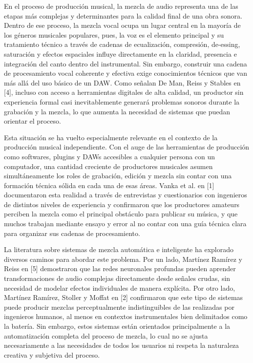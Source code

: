 
En el proceso de producción musical, la mezcla de audio representa una de las etapas más complejas y determinantes para la calidad final de una obra sonora. Dentro de ese proceso, la mezcla vocal ocupa un lugar central en la mayoría de los géneros musicales populares, pues, la voz es el elemento principal y su tratamiento técnico a través de cadenas de ecualización, compresión, de-essing, saturación y efectos espaciales influye directamente en la claridad, presencia e integración del canto dentro del instrumental. Sin embargo, construir una cadena de procesamiento vocal coherente y efectiva exige conocimientos técnicos que van más allá del uso básico de un DAW. Como señalan De Man, Reiss y Stables en [4], incluso con acceso a herramientas digitales de alta calidad, un productor sin experiencia formal casi inevitablemente generará problemas sonoros durante la grabación y la mezcla, lo que aumenta la necesidad de sistemas que puedan orientar el proceso.

Esta situación se ha vuelto especialmente relevante en el contexto de la producción musical independiente. Con el auge de las herramientas de producción como softwares, plugins y DAWs accesibles a cualquier persona con un computador, una cantidad creciente de productores musicales asumen simultáneamente los roles de grabación, edición y mezcla sin contar con una formación técnica sólida en cada una de esas áreas. Vanka et al. en [1] documentaron esta realidad a través de entrevistas y cuestionarios con ingenieros de distintos niveles de experiencia y confirmaron que los productores amateurs perciben la mezcla como el principal obstáculo para publicar su música, y que muchos trabajan mediante ensayo y error al no contar con una guía técnica clara para organizar sus cadenas de procesamiento.

La literatura sobre sistemas de mezcla automática e inteligente ha explorado diversos caminos para abordar este problema. Por un lado, Martínez Ramírez y Reiss en [5] demostraron que las redes neuronales profundas pueden aprender transformaciones de audio complejas directamente desde señales crudas, sin necesidad de modelar efectos individuales de manera explícita. Por otro lado, Martínez Ramírez, Stoller y Moffat en [2] confirmaron que este tipo de sistemas puede producir mezclas perceptualmente indistinguibles de las realizadas por ingenieros humanos, al menos en contextos instrumentales bien delimitados como la batería. Sin embargo, estos sistemas están orientados principalmente a la automatización completa del proceso de mezcla, lo cual no se ajusta necesariamente a las necesidades de todos los usuarios ni respeta la naturaleza creativa y subjetiva del proceso.

